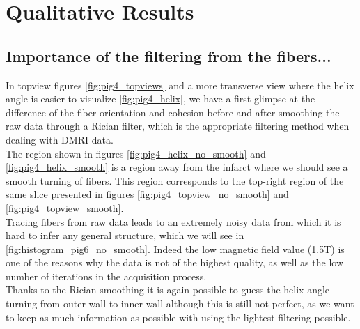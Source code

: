 \section{Qualitative Results}

\subsection{Importance of the filtering from the fibers...}

In topview figures \ref{fig:pig4_topviews} and a more transverse view where the helix angle is easier to visualize \ref{fig:pig4_helix}, we have a first glimpse at the difference of the fiber orientation and cohesion before and after smoothing the raw data through a Rician filter, which is the appropriate filtering method when dealing with DMRI data.\\
The region shown in figures \ref{fig:pig4_helix_no_smooth} and \ref{fig:pig4_helix_smooth} is a region away from the infarct where we should see a smooth turning of fibers. This region corresponds to the top-right region of the same slice presented in figures \ref{fig:pig4_topview_no_smooth} and \ref{fig:pig4_topview_smooth}.\\
Tracing fibers from raw data leads to an extremely noisy data from which it is hard to infer any general structure, which we will see in \ref{fig:histogram_pig6_no_smooth}. Indeed the low magnetic field value (1.5T) is one of the reasons why the data is not of the highest quality, as well as the low number of iterations in the acquisition process.\\
Thanks to the Rician smoothing it is again possible to guess the helix angle turning from outer wall to inner wall although this is still not perfect, as we want to keep as much information as possible with using the lightest filtering possible.

